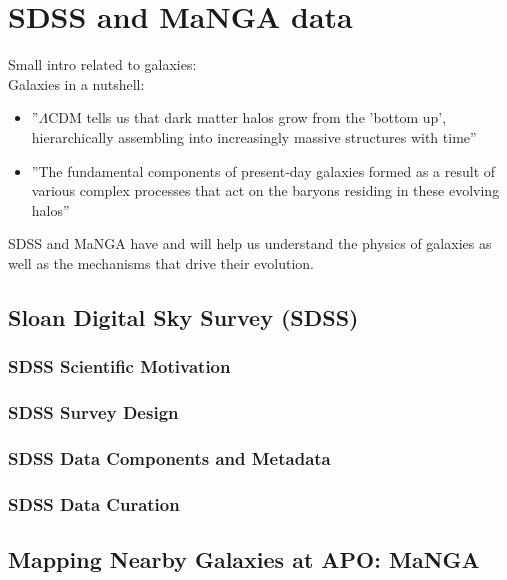 \section{SDSS and MaNGA data}
Small intro related to galaxies: \\
Galaxies in a nutshell:\\

\begin{itemize}
  \item ''$\Lambda$CDM tells us that dark matter halos grow from the 'bottom up', hierarchically assembling into increasingly massive structures with time'' \citep{bundy2015}
  \item ''The fundamental components of present-day galaxies formed as a result of various complex processes that act on the baryons residing in these evolving halos'' \citep{bundy2015}
\end{itemize}

SDSS and MaNGA have and will help us understand the physics of galaxies as well as the mechanisms that drive their evolution.

\subsection{Sloan Digital Sky Survey (SDSS)}

\subsubsection*{SDSS Scientific Motivation}

\subsubsection*{SDSS Survey Design}

\subsubsection*{SDSS Data Components and Metadata}

\subsubsection*{SDSS Data Curation}

\subsection{Mapping Nearby Galaxies at APO: MaNGA}

